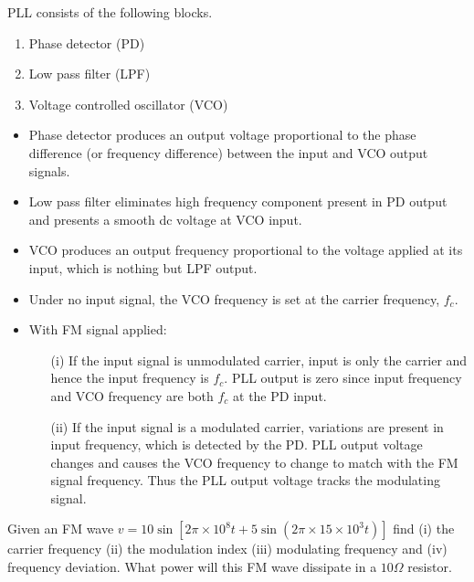 \eject

PLL consists of the following blocks.
\begin{enumerate}
\item Phase detector (PD)

\item Low pass filter (LPF)

\item Voltage controlled oscillator (VCO)
\end{enumerate}
\begin{itemize}
\item Phase detector produces an output voltage proportional to the phase difference (or frequency difference) between the input and VCO output signals.

\item Low pass filter eliminates high frequency component present in PD output and presents a smooth dc voltage at VCO input.

\item VCO produces an output frequency proportional to the voltage applied at its input, which is nothing but LPF output.
\end{itemize}

\begin{itemize}
\itemsep=1pt
\item Under no input signal, the VCO frequency is set at the carrier frequency, $f_{c}$.

\item With FM signal applied:
\begin{itemize}
\item[(i)] If the input signal is unmodulated carrier, input is only the carrier and hence the input frequency is $f_{c}$. PLL output is zero since input frequency and VCO frequency are both $f_{c}$ at the PD input.

\item[(ii)] If the input signal is a modulated carrier, variations are present in input frequency, which is detected by the PD. PLL output voltage changes and causes the VCO frequency to change to match with the FM signal frequency. Thus the PLL output voltage tracks the modulating signal.
\end{itemize}
\end{itemize}

\begin{example}\label{exam9.13}
Given an FM wave $v=10\sin [2\pi \times 10^{8}t+5\sin (2\pi \times 15\times 10^{3}t)]$ find (i) the carrier frequency (ii) the modulation index (iii) modulating frequency and (iv) frequency deviation. What power will this FM wave dissipate in a $10\Omega$ resistor.
\end{example}

